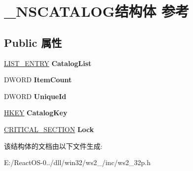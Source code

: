 \hypertarget{struct___n_s_c_a_t_a_l_o_g}{}\section{\+\_\+\+N\+S\+C\+A\+T\+A\+L\+O\+G结构体 参考}
\label{struct___n_s_c_a_t_a_l_o_g}
\subsection*{Public 属性}
\begin{DoxyCompactItemize}
\item 
\mbox{\label{struct___n_s_c_a_t_a_l_o_g_a320be40b064837e456a9cf6bc21dd4b6}} 
\hyperlink{struct___l_i_s_t___e_n_t_r_y}{L\+I\+S\+T\+\_\+\+E\+N\+T\+RY} {\bfseries Catalog\+List}
\item 
\mbox{\label{struct___n_s_c_a_t_a_l_o_g_af1413bb7d62edeaccfab56af36d046c5}} 
D\+W\+O\+RD {\bfseries Item\+Count}
\item 
\mbox{\label{struct___n_s_c_a_t_a_l_o_g_aee4b15b42b72b447078670ab0ee0c71a}} 
D\+W\+O\+RD {\bfseries Unique\+Id}
\item 
\mbox{\label{struct___n_s_c_a_t_a_l_o_g_a56fd950f41f550130c119c01e888fc8f}} 
\hyperlink{interfacevoid}{H\+K\+EY} {\bfseries Catalog\+Key}
\item 
\mbox{\label{struct___n_s_c_a_t_a_l_o_g_ad0933a1d1d980d40a1df9b04a8f522d7}} 
\hyperlink{struct___c_r_i_t_i_c_a_l___s_e_c_t_i_o_n}{C\+R\+I\+T\+I\+C\+A\+L\+\_\+\+S\+E\+C\+T\+I\+ON} {\bfseries Lock}
\end{DoxyCompactItemize}


该结构体的文档由以下文件生成\+:\begin{DoxyCompactItemize}
\item 
E\+:/\+React\+O\+S-\/0../dll/win32/ws2\+\_/inc/ws2\+\_\+32p.\+h\end{DoxyCompactItemize}
